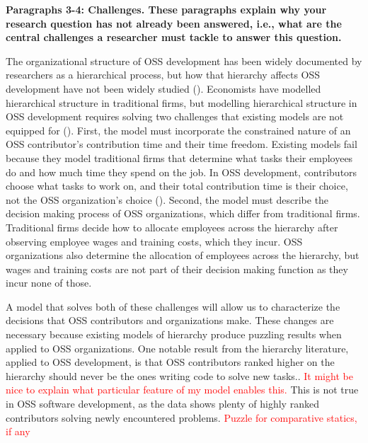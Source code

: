 \documentclass[12pt,notitlepage]{article}
\begin{document}
\textbf{Paragraphs 3-4: Challenges. These paragraphs explain why your research question has not already been answered, i.e., what are the central challenges a researcher must tackle to answer this question.}

\qquad The organizational structure of OSS development has been widely documented by researchers as a hierarchical process, but how that hierarchy affects OSS development have not been widely studied (\cite{crowston_hierarchy_2006}). Economists have modelled hierarchical structure in traditional firms, but modelling hierarchical structure in OSS development requires solving two challenges that existing models are not equipped for (\cite{garicano_hierarchies_2000}). First, the model must incorporate the constrained nature of an OSS contributor's contribution time and their time freedom. Existing models fail because they model traditional firms that determine what tasks their employees do and how much time they spend on the job. In OSS development, contributors choose what tasks to work on, and their total contribution time is their choice, not the OSS organization's choice (\cite{lerner_simple_2002}). Second, the model must describe the decision making process of OSS organizations, which differ from traditional firms. Traditional firms decide how to allocate employees across the hierarchy after observing employee wages and training costs, which they incur. OSS organizations also determine the allocation of employees across the hierarchy, but wages and training costs are not part of their decision making function as they incur none of those. 

\qquad A model that solves both of these challenges will allow us to characterize the decisions that OSS contributors and organizations make. These changes are necessary because existing models of hierarchy produce puzzling results when applied to OSS organizations. One notable result from the hierarchy literature, applied to OSS development, is that OSS contributors ranked higher on the hierarchy should never be the ones writing code to solve new tasks.. \textcolor{red}{It might be nice to explain what particular feature of my model enables this.} This is not true in OSS software development, as the data shows plenty of highly ranked contributors solving newly encountered problems. \textcolor{red}{Puzzle for comparative statics, if any}
\end{document}
